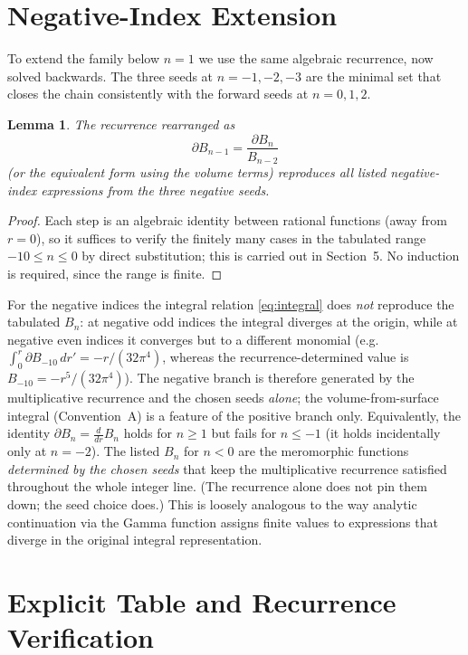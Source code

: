 \documentclass[11pt,a4paper]{article}
\newtheorem{lemma}[theorem]{Lemma}
\theoremstyle{definition}
\begin{document}
\section{Negative-Index Extension}

To extend the family below \(n=1\) we use the same algebraic recurrence, now solved backwards. The three seeds at \(n=-1,-2,-3\) are the minimal set that closes the chain consistently with the forward seeds at \(n=0,1,2\).

\begin{lemma}
The recurrence rearranged as
\[
\partial B_{n-1} = \frac{\partial B_n}{B_{n-2}}
\]
(or the equivalent form using the volume terms) reproduces all listed negative-index expressions from the three negative seeds.
\end{lemma}

\begin{proof}
Each step is an algebraic identity between rational functions (away from \(r=0\)), so it suffices to verify the finitely many cases in the tabulated range \(-10\le n\le 0\) by direct substitution; this is carried out in Section~5. No induction is required, since the range is finite.
\end{proof}

For the negative indices the integral relation \eqref{eq:integral} does \emph{not} reproduce the tabulated \(B_n\): at negative odd indices the integral diverges at the origin, while at negative even indices it converges but to a different monomial (e.g.\ \(\int_0^r \partial B_{-10}\,dr' = -r/(32\pi^4)\), whereas the recurrence-determined value is \(B_{-10}=-r^5/(32\pi^4)\)). The negative branch is therefore generated by the multiplicative recurrence and the chosen seeds \emph{alone}; the volume-from-surface integral (Convention~A) is a feature of the positive branch only. Equivalently, the identity \(\partial B_n = \tfrac{d}{dr}B_n\) holds for \(n\ge 1\) but fails for \(n\le -1\) (it holds incidentally only at \(n=-2\)). The listed \(B_n\) for \(n<0\) are the meromorphic functions \emph{determined by the chosen seeds} that keep the multiplicative recurrence satisfied throughout the whole integer line. (The recurrence alone does not pin them down; the seed choice does.) This is loosely analogous to the way analytic continuation via the Gamma function assigns finite values to expressions that diverge in the original integral representation.

\section{Explicit Table and Recurrence Verification}
\end{document}
